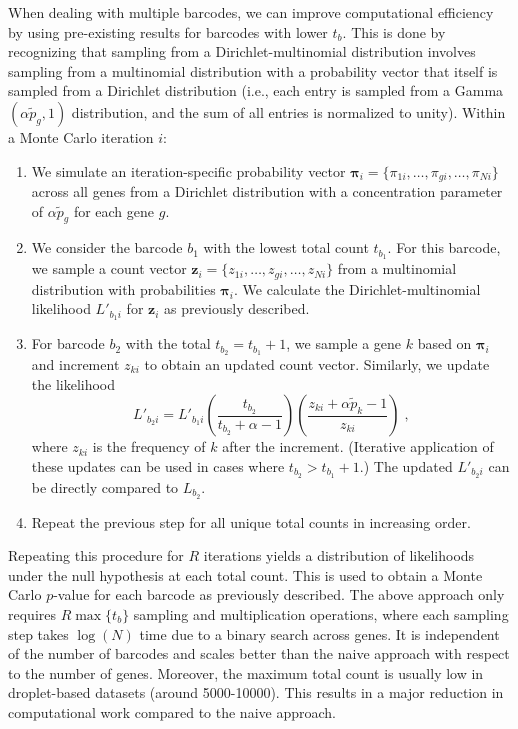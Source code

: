 \documentclass{article}
\begin{document}
When dealing with multiple barcodes, we can improve computational efficiency by using pre-existing results for barcodes with lower $t_b$.
This is done by recognizing that sampling from a Dirichlet-multinomial distribution involves sampling from a multinomial distribution with a probability vector that itself is sampled from a Dirichlet distribution (i.e., each entry is sampled from a Gamma$(\alpha\tilde{p}_g, 1)$ distribution, and the sum of all entries is normalized to unity).
Within a Monte Carlo iteration $i$:
\begin{enumerate}
\item We simulate an iteration-specific probability vector $\pmb{\pi}_i = \{ \pi_{1i}, \ldots, \pi_{gi}, \ldots, \pi_{Ni} \}$ across all genes from a Dirichlet distribution with a concentration parameter of $\alpha\tilde{p}_g$ for each gene $g$.
\item We consider the barcode $b_1$ with the lowest total count $t_{b_1}$. 
For this barcode, we sample a count vector $\mathbf{z}_{i} = \{ z_{1i}, \ldots, z_{gi}, \ldots, z_{Ni} \}$ from a multinomial distribution with probabilities $\pmb{\pi}_i$. 
We calculate the Dirichlet-multinomial likelihood $L'_{b_1i}$ for $\mathbf{z}_{i}$ as previously described.
\item For barcode $b_2$ with the total $t_{b_2}=t_{b_1}+1$, we sample a gene $k$ based on $\pmb{\pi}_i$ and increment $z_{ki}$ to obtain an updated count vector.
Similarly, we update the likelihood 
\[
    L'_{b_2i} = L'_{b_1i} \left( \frac{t_{b_2}}{t_{b_2} + \alpha - 1} \right) \left( \frac{z_{ki} + \alpha\tilde{p}_k - 1}{z_{ki}} \right) \;,
\]
where $z_{ki}$ is the frequency of $k$ after the increment.
(Iterative application of these updates can be used in cases where $t_{b_2} > t_{b_1}+1$.)
The updated $L'_{b_2i}$ can be directly compared to $L_{b_2}$.
\item Repeat the previous step for all unique total counts in increasing order.
\end{enumerate}
Repeating this procedure for $R$ iterations yields a distribution of likelihoods under the null hypothesis at each total count.
This is used to obtain a Monte Carlo $p$-value for each barcode as previously described.
The above approach only requires $R \max\{t_b\}$ sampling and multiplication operations, where each sampling step takes $\log(N)$ time due to a binary search across genes.
It is independent of the number of barcodes and scales better than the naive approach with respect to the number of genes.
Moreover, the maximum total count is usually low in droplet-based datasets (around 5000-10000).
This results in a major reduction in computational work compared to the naive approach.
\end{document}
